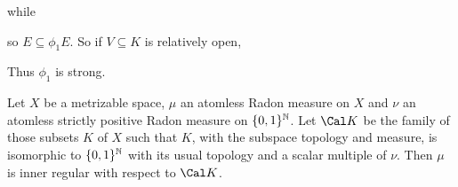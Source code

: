 {

\noindent while


\noindent so $E\subseteq\phi_1E$.   So if $V\subseteq K$ is relatively
open,


\noindent Thus $\phi_1$ is strong.\ \Qed
}%

 Let $X$ be a metrizable space, $\mu$ an atomless
Radon measure on $X$ and $\nu$ an atomless strictly positive Radon
measure on $\{0,1\}^{\Bbb N}$.   Let $\Cal K$ be the family of those
subsets $K$ of $X$ such that $K$, with the subspace topology and
measure, is isomorphic to $\{0,1\}^{\Bbb N}$ with its usual topology and
a scalar multiple of $\nu$.   Then $\mu$ is inner regular with respect
to $\Cal K$.

